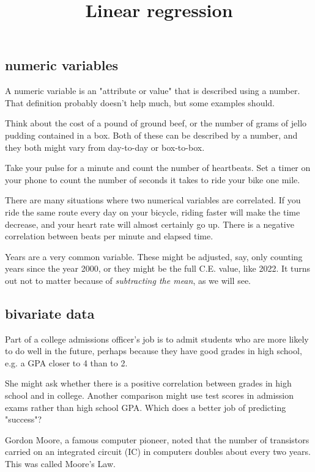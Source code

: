 \documentclass[11pt, oneside]{article}
\title{Linear regression}
\date{}
\begin{document}
\maketitle
\Large

\subsection*{numeric variables}

A numeric variable is an "attribute or value" that is described using a number.  That definition probably doesn't help much, but some examples should.

Think about the cost of a pound of ground beef, or the number of grams of jello pudding contained in a box.  Both of these can be described by a number, and they both might vary from day-to-day or box-to-box.

Take your pulse for a minute and count the number of heartbeats.  Set a timer on your phone to count the number of seconds it takes to ride your bike one mile.

There are many situations where two numerical variables are correlated.  If you ride the same route every day on your bicycle, riding faster will make the time decrease, and your heart rate will almost certainly go up.  There is a negative correlation between beats per minute and elapsed time.

Years are a very common variable.  These might be adjusted, say, only counting years since the year 2000, or they might be the full C.E. value, like 2022.  It turns out not to matter because of \emph{subtracting the mean}, as we will see.

\subsection*{bivariate data}

Part of a college admissions officer's job is to admit students who are more likely to do well in the future, perhaps because they have good grades in high school, e.g. a GPA closer to 4 than to 2.

She might ask whether there is a positive correlation between grades in high school and in college.  Another comparison might use test scores in admission exams rather than high school GPA.  Which does a better job of predicting "success"?

Gordon Moore, a famous computer pioneer, noted that the number of transistors carried on an integrated circuit (IC) in computers doubles about every two years.  This was called Moore's Law.
\end{document}
